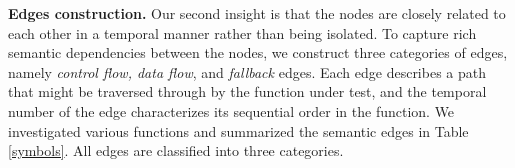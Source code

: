 \begin{table}
\centering
{}
\caption{Semantic edges summarization. All edges are classified into three categories, namely control-flow, data-flow, and fallback edges.}
\label{symbols}
 \vspace{-1.8em}
\end{table}

\textbf{Edges construction.} Our second insight is that the nodes are closely related to each other in a temporal manner rather than being isolated. To capture rich semantic dependencies between the nodes, we construct three categories of edges, namely \emph{control flow, data flow}, and \emph{fallback} edges. Each edge describes a path that might be traversed through by the function under test, and the temporal number of the edge characterizes its sequential order in the function. We investigated various functions and summarized the semantic edges in Table \ref{symbols}. All edges are classified into three categories. 

